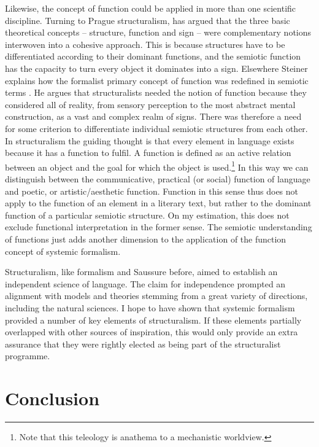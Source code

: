 \documentclass[output=paper]{langscibook}
\begin{document}
Likewise, the concept of function could be applied in more than one scientific discipline. Turning to Prague structuralism, \citet{Steiner1976} has argued that the three basic theoretical concepts -- structure, function and sign -- were complementary notions interwoven into a cohesive approach. This is because structures have to be differentiated according to their dominant functions, and the semiotic function has the capacity to turn every object it dominates into a sign. Elsewhere Steiner explains how the formalist primary concept of function was redefined in semiotic terms \citep[264--266]{Steiner1984}. He argues that structuralists needed the notion of function because they considered all of reality, from sensory perception to the most abstract mental construction, as a vast and complex realm of signs. There was therefore a need for some criterion to differentiate individual semiotic structures from each other. In structuralism the guiding thought is that every element in language exists because it has a function to fulfil. A function is defined as an active relation between an object and the goal for which the object is used.\footnote{Note that this teleology is anathema to a mechanistic worldview.} In this way we can distinguish between the communicative, practical (or social) function of language and poetic, or artistic/aesthetic function. Function in this sense thus does not apply to the function of an element in a literary text, but rather to the dominant function of a particular semiotic structure. On my estimation, this does not exclude functional interpretation in the former sense. The semiotic understanding of functions just adds another dimension to the application of the function concept of systemic formalism.

Structuralism, like formalism and Saussure before, aimed to establish an independent science of language. The claim for independence prompted an alignment with models and theories stemming from a great variety of directions, including the natural sciences. I hope to have shown that systemic formalism provided a number of key elements of structuralism. If these elements partially overlapped with other sources of inspiration, this would only provide an extra assurance that they were rightly elected as being part of the structuralist programme. 

\section{Conclusion}
\label{sec:karstens:conclusion}
\end{document}

